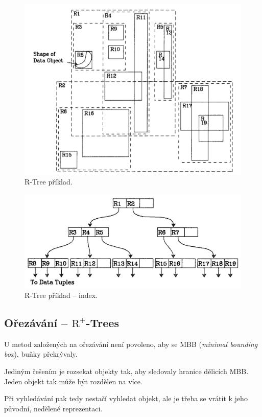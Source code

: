 \begin{figure}[H]
    \centering
    \includegraphics[width=0.85\linewidth]{r_tree_1.pdf}
    \caption{R-Tree příklad.}
\end{figure}

\begin{figure}[H]
    \centering
    \includegraphics[width=0.85\linewidth]{r_tree_2.pdf}
    \caption{R-Tree příklad -- index.}
\end{figure}

\subsection{Ořezávání -- $\text{R}^+$-Trees}

\begin{compactitem}
    \item U metod založených na ořezávání není povoleno, aby se MBB (\textit{minimal bounding box}), buňky překrývaly.
    \item Jediným řešením je rozsekat objekty tak, aby sledovaly hranice dělicích MBB. Jeden objekt tak může být rozdělen na více.
    \item Při vyhledávání pak tedy nestačí vyhledat objekt, ale je třeba se vrátit k jeho původní, nedělené reprezentaci.
\end{compactitem}

